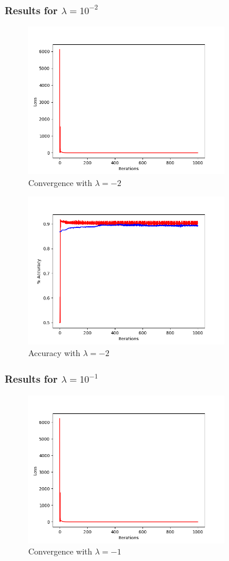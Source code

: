 \documentclass[letterpaper,10pt]{article}
\begin{document}
\subsubsection{Results for \(\lambda = 10^{-2}\)}
     \begin{figure}[ht]
    \centering
   \includegraphics[width=250pt]{L2-neg2-convergence.png}
    \caption{Convergence with \(\lambda = -2\)}
    \label{fig:Convergence of loss function over iterations}
    \end{figure}

     \begin{figure}[ht]
    \centering
   \includegraphics[width=250pt]{L2-neg2-gradientLong.png}
     \caption{Accuracy with \(\lambda = -2\)}
    \label{fig:Plot of accuracy over iterations. Red is training data.}
    \end{figure}
\subsubsection{Results for \(\lambda = 10^{-1}\)}
     \begin{figure}[ht]
    \centering
   \includegraphics[width=250pt]{L2-neg1-convergence.png}
    \caption{Convergence with \(\lambda = -1\)}
    \label{fig:Convergence of loss function over iterations}
    \end{figure}
\end{document}
